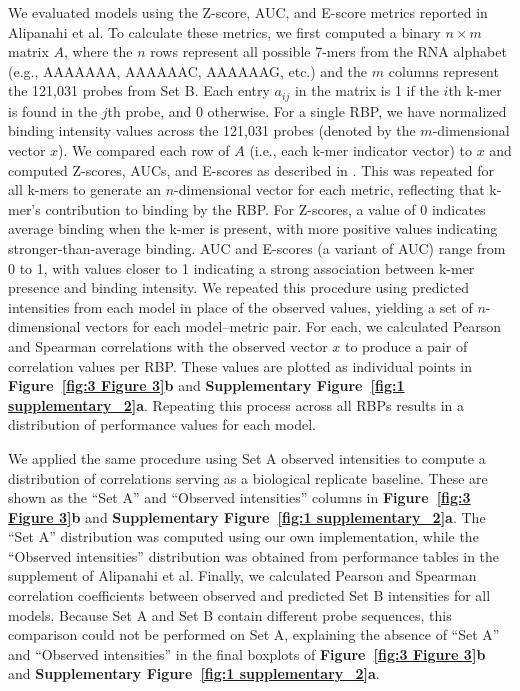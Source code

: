We evaluated models using the Z-score, AUC, and E-score metrics reported in Alipanahi et al. To calculate these metrics, we first computed a binary $n \times m$ matrix $A$, where the $n$ rows represent all possible 7-mers from the RNA alphabet (e.g., AAAAAAA, AAAAAAC, AAAAAAG, etc.) and the $m$ columns represent the 121{,}031 probes from Set B. Each entry $a_{ij}$ in the matrix is 1 if the $i$th k-mer is found in the $j$th probe, and 0 otherwise. For a single RBP, we have normalized binding intensity values across the 121{,}031 probes (denoted by the $m$-dimensional vector $x$). We compared each row of $A$ (i.e., each k-mer indicator vector) to $x$ and computed Z-scores, AUCs, and E-scores as described in \cite{Alipanahi2015-ef,Ray2013-yd}. This was repeated for all k-mers to generate an $n$-dimensional vector for each metric, reflecting that k-mer's contribution to binding by the RBP. For Z-scores, a value of 0 indicates average binding when the k-mer is present, with more positive values indicating stronger-than-average binding. AUC and E-scores (a variant of AUC) range from 0 to 1, with values closer to 1 indicating a strong association between k-mer presence and binding intensity. We repeated this procedure using predicted intensities from each model in place of the observed values, yielding a set of $n$-dimensional vectors for each model–metric pair. For each, we calculated Pearson and Spearman correlations with the observed vector $x$ to produce a pair of correlation values per RBP. These values are plotted as individual points in \textbf{Figure~\ref{fig:3 Figure 3}\textbf{b}} and \textbf{Supplementary Figure~\ref{fig:1 supplementary_2}\textbf{a}}. Repeating this process across all RBPs results in a distribution of performance values for each model.

We applied the same procedure using Set A observed intensities to compute a distribution of correlations serving as a biological replicate baseline. These are shown as the “Set A” and “Observed intensities” columns in \textbf{Figure~\ref{fig:3 Figure 3}\textbf{b}} and \textbf{Supplementary Figure~\ref{fig:1 supplementary_2}\textbf{a}}. The “Set A” distribution was computed using our own implementation, while the “Observed intensities” distribution was obtained from performance tables in the supplement of Alipanahi et al. Finally, we calculated Pearson and Spearman correlation coefficients between observed and predicted Set B intensities for all models. Because Set A and Set B contain different probe sequences, this comparison could not be performed on Set A, explaining the absence of “Set A” and “Observed intensities” in the final boxplots of \textbf{Figure~\ref{fig:3 Figure 3}\textbf{b}} and \textbf{Supplementary Figure~\ref{fig:1 supplementary_2}\textbf{a}}.

